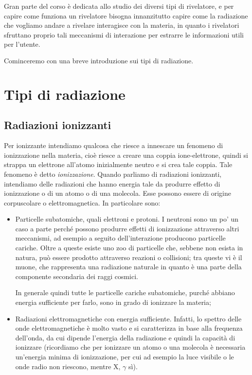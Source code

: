 Gran parte del corso è dedicata allo studio dei diversi tipi di rivelatore, e per capire come funziona un rivelatore bisogna innanzitutto capire come la radiazione che vogliamo andare a rivelare interagisce con la materia, in quanto i rivelatori sfruttano proprio tali meccanismi di interazione per estrarre le informazioni utili per l'utente.

Cominceremo con una breve introduzione sui tipi di radiazione.

\section{Tipi di radiazione}

\subsection{Radiazioni ionizzanti}
Per ionizzante intendiamo qualcosa che riesce a innescare un fenomeno di ionizzazione nella materia, cioè riesce a creare una coppia ione-elettrone, quindi si strappa un elettrone all'atomo inizialmente neutro e si crea tale coppia. Tale fenomeno è detto \textit{ionizzazione}. Quando parliamo di radiazioni ionizzanti, intendiamo delle radiazioni che hanno energia tale da produrre effetto di ionizzazione o di un atomo o di una molecola. Esse possono essere di origine corpuscolare o elettromagnetica. In particolare sono:

\begin{itemize}
    \item Particelle subatomiche, quali elettroni e protoni. I neutroni sono un po' un caso a parte perché possono produrre effetti di ionizzazione attraverso altri meccanismi, ad esempio a seguito dell'interazione producono particelle cariche. Oltre a queste esiste uno zoo di particelle che, sebbene non esista in natura, può essere prodotto attraverso reazioni o collisioni; tra queste vi è il muone, che rappresenta una radiazione naturale in quanto è una parte della componente secondaria dei raggi cosmici.
    
    In generale quindi tutte le particelle cariche subatomiche, purché abbiano energia sufficiente per farlo, sono in grado di ionizzare la materia;
    \item Radiazioni elettromagnetiche con energia sufficiente. Infatti, lo spettro delle onde elettromagnetiche è molto vasto e si caratterizza in base alla frequenza dell'onda, da cui dipende l'energia della radiazione e quindi la capacità di ionizzare (ricordiamo che per ionizzare un atomo o una molecola è necessaria un'energia minima di ionizzazione, per cui ad esempio la luce visibile o le onde radio non riescono, mentre X, $\gamma$ sì).
\end{itemize}

